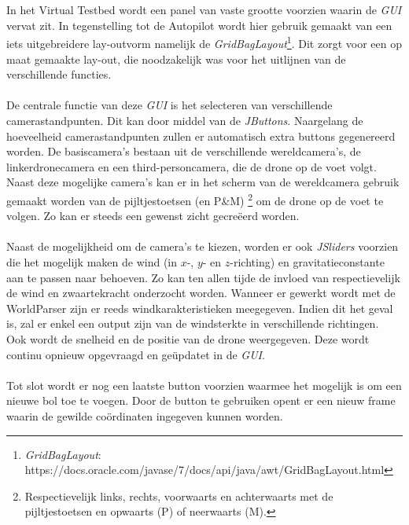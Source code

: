 \\
\\
In het Virtual Testbed wordt een panel van vaste grootte voorzien waarin de \textit{GUI} vervat zit. In tegenstelling tot de Autopilot wordt hier gebruik gemaakt van een iets uitgebreidere lay-outvorm namelijk de \textit{GridBagLayout}\footnote{\textit{GridBagLayout}: https://docs.oracle.com/javase/7/docs/api/java/awt/GridBagLayout.html}. Dit zorgt voor een op maat gemaakte lay-out, die noodzakelijk was voor het uitlijnen van de verschillende functies. 
\\
\\
De centrale functie van deze \textit{GUI} is het selecteren van verschillende camerastandpunten. Dit kan door middel van de \textit{JButtons}. Naargelang de hoeveelheid camerastandpunten zullen er automatisch extra buttons gegenereerd worden. De basiscamera's bestaan uit de verschillende wereldcamera's, de linkerdronecamera en een third-personcamera, die de drone op de voet volgt. Naast deze mogelijke camera's kan er in het scherm van de wereldcamera gebruik gemaakt worden van de pijltjestoetsen (en P\&M) \footnote{Respectievelijk links, rechts, voorwaarts en achterwaarts met de pijltjestoetsen en opwaarts (P) of neerwaarts (M).} om de drone op de voet te volgen. Zo kan er steeds een gewenst zicht gecre\"eerd worden.
\\
\\
Naast de mogelijkheid om de camera's te kiezen, worden er ook \textit{JSliders} voorzien die het mogelijk maken de wind (in \(x\)-, \(y\)- en \(z\)-richting) en gravitatieconstante aan te passen naar behoeven. Zo kan ten allen tijde de invloed van respectievelijk de wind en zwaartekracht onderzocht worden. Wanneer er gewerkt wordt met de WorldParser zijn er reeds windkarakteristieken meegegeven. Indien dit het geval is, zal er enkel een output zijn van de windsterkte in verschillende richtingen.
\\
Ook wordt de snelheid en de positie van de drone weergegeven. Deze wordt continu opnieuw opgevraagd en ge\"{u}pdatet in de \textit{GUI}. 
\\
\\
Tot slot wordt er nog een laatste button voorzien waarmee het mogelijk is om een nieuwe bol toe te voegen. Door de button te gebruiken opent er een nieuw frame waarin de gewilde co\"ordinaten ingegeven kunnen worden. 
